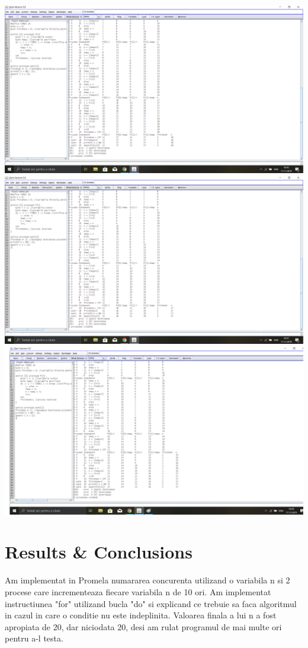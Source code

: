 \documentclass{article}
\begin{document}
\hspace{0.5 cm}
\includegraphics[width=2.2\textwidth]{P2_1.png}
\includegraphics[width=2.2\textwidth]{images/P2_2.png}
\includegraphics[width=2.2\textwidth]{images/P2_3.png}

\section{Results \& Conclusions}
\hspace{0.5 cm}
Am implementat in Promela numararea concurenta utilizand o variabila n si 2 procese care incrementeaza fiecare variabila n de 10 ori. Am implementat instructiunea "for" utilizand bucla "do" si explicand ce trebuie sa faca algoritmul in cazul in care o conditie nu este indeplinita. Valoarea finala a lui n a fost apropiata de 20, dar niciodata 20, desi am rulat programul de mai multe ori pentru a-l testa.
\end{document}

